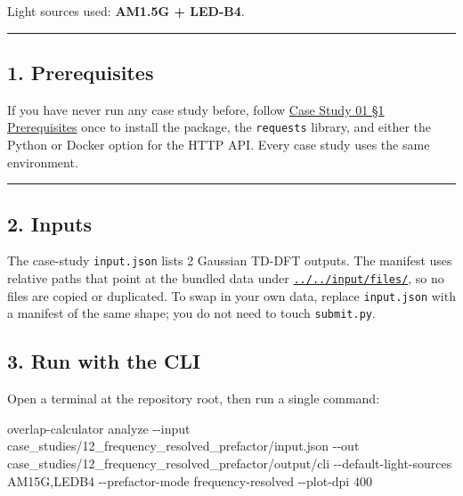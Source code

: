 \documentclass[
  11pt,
]{article}
\newenvironment{Shaded}{}{}
\newcommand{\AttributeTok}[1]{\textcolor[rgb]{0.49,0.56,0.16}{#1}}
\newcommand{\ExtensionTok}[1]{#1}
\newcommand{\NormalTok}[1]{#1}
\begin{document}
Light sources used: \textbf{AM1.5G + LED-B4}.

\begin{center}\rule{0.5\linewidth}{0.5pt}\end{center}

\hypertarget{1-prerequisites}{
\subsection{1. Prerequisites}\label{1-prerequisites}}

If you have never run any case study before, follow
\href{https://github.com/pinarsyt/overlap-calculator/blob/main/case_studies/01_theoretical_only/README.md\#1-prerequisites}{Case
Study 01 \S1 Prerequisites} once to install the package, the
\texttt{requests} library, and either the Python or Docker option for
the HTTP API. Every case study uses the same environment.

\begin{center}\rule{0.5\linewidth}{0.5pt}\end{center}

\hypertarget{2-inputs}{
\subsection{2. Inputs}\label{2-inputs}}

The case-study \texttt{input.json} lists 2 Gaussian TD-DFT outputs. The
manifest uses relative paths that point at the bundled data under
\href{https://github.com/pinarsyt/overlap-calculator/blob/main/input/files}{\texttt{../../input/files/}},
so no files are copied or duplicated. To swap in your own data, replace
\texttt{input.json} with a manifest of the same shape; you do not need
to touch \texttt{submit.py}.

\hypertarget{3-run-with-the-cli}{
\subsection{3. Run with the CLI}\label{3-run-with-the-cli}}

Open a terminal at the repository root, then run a single command:

\begin{Shaded}
\begin{Highlighting}[]
\ExtensionTok{overlap{-}calculator}\NormalTok{ analyze }\AttributeTok{{-}{-}input}\NormalTok{ case\_studies/12\_frequency\_resolved\_prefactor/input.json }\AttributeTok{{-}{-}out}\NormalTok{ case\_studies/12\_frequency\_resolved\_prefactor/output/cli }\AttributeTok{{-}{-}default{-}light{-}sources}\NormalTok{ AM15G,LEDB4 }\AttributeTok{{-}{-}prefactor{-}mode}\NormalTok{ frequency-resolved }\AttributeTok{{-}{-}plot{-}dpi}\NormalTok{ 400}
\end{Highlighting}
\end{Shaded}
\end{document}

